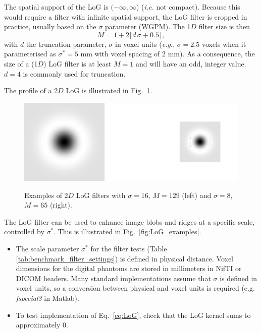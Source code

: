 \documentclass[fleqn,a4paper,oneside,openany]{book}
\newcommand\textid[1]{{\normalsize{\idfont #1}}}
\begin{document}
The spatial support of the LoG is \((-\infty, \infty\)) (\emph{i.e.} not compact). 
Because this would require a filter with infinite spatial support, the LoG filter is cropped in practice, usually based on the $\sigma$ parameter (\textid{WGPM}). The 1$D$ filter size is then
$$M=1 + 2\lfloor d\, \sigma + 0.5\rfloor,$$
with \(d\) the truncation parameter, \(\sigma\)  in voxel units (\emph{e.g.}, \(\sigma=2.5\) voxels when it parameterised as \(\sigma^* = 5\) mm with voxel spacing of \(2\) mm). As a consequence, the size of a (1$D$) LoG filter is at least \(M=1\) and will have an odd, integer value. \(d=4\) is commonly used for truncation.

The profile of a 2$D$ LoG is illustrated in Fig.~\ref{fig:LoG}.
%
\begin{figure}
\centering
\includegraphics[trim = 0 0 0 0, clip, scale=0.8]{LoG.png}\\
\caption{Examples of 2$D$ LoG filters with $\sigma=16$, $M=129$ (left) and $\sigma=8$, $M=65$ (right).}
  \label{fig:LoG}
\end{figure}
%
The LoG filter can be used to enhance image blobs and ridges at a specific scale, controlled by $\sigma^*$.
This is illustrated in Fig.~\ref{fig:LoG_examples}.

\vspace{2mm}
\begin{tcolorbox}[width=150mm, halign=left, colframe=black, colback=white, boxsep=0mm, arc=3mm, colframe=black!50!white,
title=Implementation Troubleshooting, title filled=true, fonttitle=\bfseries]
\begin{itemize}
\item The scale parameter $\sigma^*$ for the filter tests (Table \ref{tab:benchmark_filter_settings}) is defined in physical distance. Voxel dimensions for the digital phantoms are stored in millimeters in NifTI or DICOM headers. Many standard implementations assume that $\sigma$ is defined in voxel units, so a conversion between physical and voxel units is required (e.g. \textit{fspecial3} in Matlab).
\item To test implementation of Eq.\ \ref{eq:LoG}, check that the LoG kernel sums to approximately 0.
\end{itemize}
\end{tcolorbox}
\end{document}
